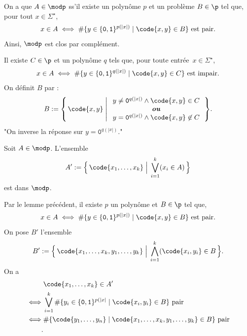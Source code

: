 \documentclass[./main]{subfiles}
\begin{document}
  \begin{lem}
    On a que $A \in \modp$ ss'il existe un polynôme $p$ et un problème $B \in \p$ tel que, pour tout $x \in \Sigma^\star$,
    \[
      x \in A \iff \# \{y \in \{\texttt{0},\texttt{1}\}^{p(|x|)}  \mid \code{x, y} \in B\}  \text{ est pair}
    .\]
    Ainsi, $\modp$ est clos par complément.
  \end{lem}
  \begin{prv}
    Il existe $C \in \p$ et un polynôme $q$ tels que, pour toute entrée~$x \in \Sigma^\star$,
    \[
      x \in A \iff \# \{y \in \{\texttt{0},\texttt{1}\}^{q(|x|)}  \mid \code{x, y} \in C\}  \text{ est impair}
    .\]
    On définit $B$ par :
    \[
      B := \mleft\{\, \code{x, y} \;\middle|\;
      \begin{array}{c}
        y \neq \texttt{0}^{q(|x|)} \wedge \code{x,y} \in C\\
        \text{\textit{\textbf{ou}}}\\
        y = \texttt{0}^{q(|x|)} \wedge \code{x, y} \not\in C
      \end{array}\,\mright\} 
    .\]
    "On inverse la réponse sur $y = \texttt{0}^{q(|x|)}$."
  \end{prv}

  \begin{lem}
    Soit $A \in \modp$. L'ensemble
    \[
      A' := \Big\{\, \code{x_1, \ldots, x_k} \;\Big|\; \bigvee_{i=1}^k (x_i \in A)\,\Big\} 
    \] est dans $\modp$.
  \end{lem}
  \begin{prv}
    Par le lemme précédent, il existe $p$ un polynôme et $B \in \p$ tel que,
    \[
      x \in A \iff \# \{y \in \{\texttt{0},\texttt{1}\}^{p(|x|)}  \mid \code{x, y} \in B\}  \text{ est pair}
    .\] 
    On pose $B'$ l'ensemble
    \[
      B' := \Big\{\,\code{x_1, \ldots, x_k, y_1, \ldots, y_k} \;\Big|\; \bigwedge_{i=1}^k (\code{x_i, y_i} \in B \,\Big\} 
    .\]
    On a 
    \begin{align*}
      &\code{x_1, \ldots, x_k} \in A' \\
      \iff& \bigvee_{i=1}^k \# \{y_i \in \{\texttt{0},\texttt{1}\}^{p(|x|}  \mid \code{x_i, y_i} \in B \} \text{ pair}\\
      \iff& \# \{ \code{y_1, \ldots, y_n}  \mid  \code{x_1, \ldots, x_k, y_1, \ldots, y_k} \in B\} \text{ pair} \\
    .\end{align*}
  \end{prv}

  \hspace{12pt}
\end{document}
